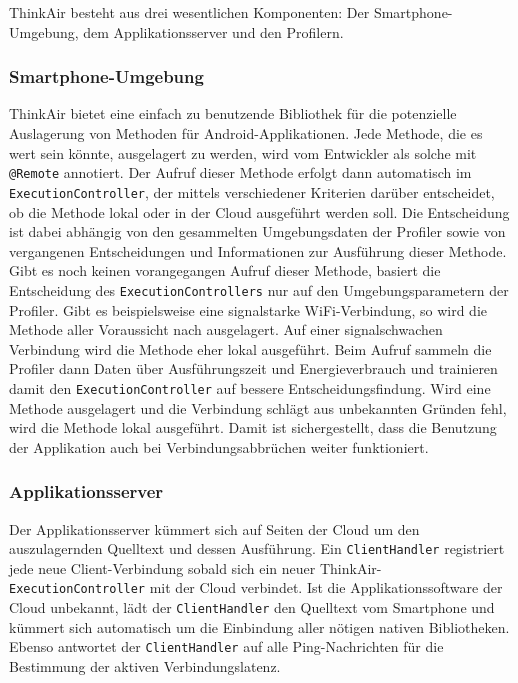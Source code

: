 \documentclass{sigchi}
\begin{document}
ThinkAir besteht aus drei wesentlichen Komponenten: Der Smartphone-Umgebung, dem Applikationsserver und den Profilern.

\subsubsection{Smartphone-Umgebung}

ThinkAir bietet eine einfach zu benutzende Bibliothek für die potenzielle Auslagerung von Methoden für Android-Applikationen.
Jede Methode, die es wert sein könnte, ausgelagert zu werden, wird vom Entwickler als solche mit \texttt{@Remote} annotiert.
Der Aufruf dieser Methode erfolgt dann automatisch im \texttt{ExecutionController}, der mittels verschiedener Kriterien darüber entscheidet, ob die Methode lokal oder in der Cloud ausgeführt werden soll.
Die Entscheidung ist dabei abhängig von den gesammelten Umgebungsdaten der Profiler sowie von vergangenen Entscheidungen und Informationen zur Ausführung dieser Methode.
Gibt es noch keinen vorangegangen Aufruf dieser Methode, basiert die Entscheidung des \texttt{ExecutionControllers} nur auf den Umgebungsparametern der Profiler.
Gibt es beispielsweise eine signalstarke WiFi-Verbindung, so wird die Methode aller Voraussicht nach ausgelagert.
Auf einer signalschwachen Verbindung wird die Methode eher lokal ausgeführt.
Beim Aufruf sammeln die Profiler dann Daten über Ausführungszeit und Energieverbrauch und trainieren damit den \texttt{ExecutionController} auf bessere Entscheidungsfindung.
Wird eine Methode ausgelagert und die Verbindung schlägt aus unbekannten Gründen fehl, wird die Methode lokal ausgeführt.
Damit ist sichergestellt, dass die Benutzung der Applikation auch bei Verbindungsabbrüchen weiter funktioniert.

\subsubsection{Applikationsserver}

Der Applikationsserver kümmert sich auf Seiten der Cloud um den auszulagernden Quelltext und dessen Ausführung.
Ein \texttt{ClientHandler} registriert jede neue Client-Verbindung sobald sich ein neuer ThinkAir-\texttt{ExecutionController} mit der Cloud verbindet.
Ist die Applikationssoftware der Cloud unbekannt, lädt der \texttt{ClientHandler} den Quelltext vom Smartphone und kümmert sich automatisch um die Einbindung aller nötigen nativen Bibliotheken.
Ebenso antwortet der \texttt{ClientHandler} auf alle Ping-Nachrichten für die Bestimmung der aktiven Verbindungslatenz.
\end{document}
